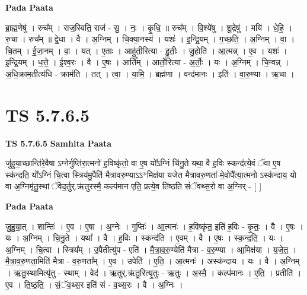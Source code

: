 \documentclass[17pt]{extarticle}
\begin{document}
\textbf{Pada Paata} \newline

ब्रा॒ह्म॒णेषु॑ । रुच᳚म् । राज॒स्विति॒ राज॑ - सु॒ । नः॒ । कृ॒धि॒ ॥ रुच᳚म् । वि॒श्ये॑षु । शू॒द्रेषु॑ । मयि॑ । धे॒हि॒ । रु॒चा । रुच᳚म् ॥ द्वे॒धा । वै । अ॒ग्निम् । चि॒क्या॒नस्य॑ । यशः॑ । इ॒न्द्रि॒यम् । ग॒च्छ॒ति॒ । अ॒ग्निम् । वा॒ । चि॒तम् । ई॒जा॒नम् । वा॒ । यत् । ए॒ताः । आहु॑ती॒रित्या - हु॒तीः॒ । जु॒होति॑ । आ॒त्मन्न् । ए॒व । यशः॑ । इ॒न्द्रि॒यम् । ध॒त्ते॒ । ई॒श्व॒रः । वै । ए॒षः । आर्ति᳚म् । आर्तो॒रित्या - अ॒र्तोः॒ । यः । अ॒ग्निम् । चि॒न्वन्न् । अ॒धि॒क्राम॒तीत्य॑धि - क्राम॑ति । तत् । त्वा॒ । या॒मि॒ । ब्रह्म॑णा । वन्द॑मानः । इति॑ । वा॒रु॒ण्या । ऋ॒चा ।  \newline




\section*{ TS 5.7.6.5 }

\textbf{TS 5.7.6.5 } \newline
\textbf{Samhita Paata} \newline

जु॑हुया॒च्छान्ति॑रे॒वैषा ऽग्नेर्गुप्ति॑रा॒त्मनो॑ ह॒विष्कृ॑तो॒ वा ए॒ष यो᳚ऽग्निं चि॑नु॒ते यथा॒ वै ह॒विः स्कन्द॑त्ये॒वं ॅवा ए॒ष स्क॑न्दति॒ यो᳚ऽग्निं चि॒त्वा स्त्रिय॑मु॒पैति॑ मैत्रावरु॒ण्याऽऽ*मिक्ष॑या यजेत मैत्रावरु॒णता॑-मे॒वोपै᳚त्या॒त्मनो ऽस्क॑न्दाय॒ यो वा अ॒ग्निमृ॑तु॒स्थां ॅवेद॒र्तुर्.ऋ॑तुरस्मै॒ कल्प॑मान एति॒ प्रत्ये॒व ति॑ष्ठति संॅवथ्स॒रो वा अ॒ग्निर् - [  ] \newline

\textbf{Pada Paata} \newline

जु॒हु॒या॒त् । शान्तिः॑ । ए॒व । ए॒षा । अ॒ग्नेः । गुप्तिः॑ । आ॒त्मनः॑ । ह॒विष्कृ॑त॒ इति॑ ह॒विः - कृ॒तः॒ । वै । ए॒षः । यः । अ॒ग्निम् । चि॒नु॒ते । यथा᳚ । वै । ह॒विः । स्कन्द॑ति । ए॒वम् । वै । ए॒षः । स्क॒न्द॒ति॒ । यः । अ॒ग्निम् । चि॒त्वा । स्त्रिय᳚म् । उ॒पैतीत्यु॑प - एति॑ । मै॒त्रा॒व॒रु॒ण्येति॑ मैत्रा - व॒रु॒ण्या । आ॒मिक्ष॑या । य॒जे॒त॒ । मै॒त्रा॒व॒रु॒णता॒मिति॑ मैत्रा - व॒रु॒णता᳚म् । ए॒व । उपेति॑ । ए॒ति॒ । आ॒त्मनः॑ । अस्क॑न्दाय । यः । वै । अ॒ग्निम् । ऋ॒तु॒स्थामित्यृ॑तु - स्थाम् । वेद॑ । ऋ॒तुर्.ऋ॑तु॒रित्यृ॒तुः - ऋ॒तुः॒ । अ॒स्मै॒ । कल्प॑मानः । ए॒ति॒ । प्रतीति॑ । ए॒व । ति॒ष्ठ॒ति॒ । सं॒ॅव॒थ्स॒र इति॑ सं - व॒थ्स॒रः । वै । अ॒ग्निः ।  \newline
\end{document}

